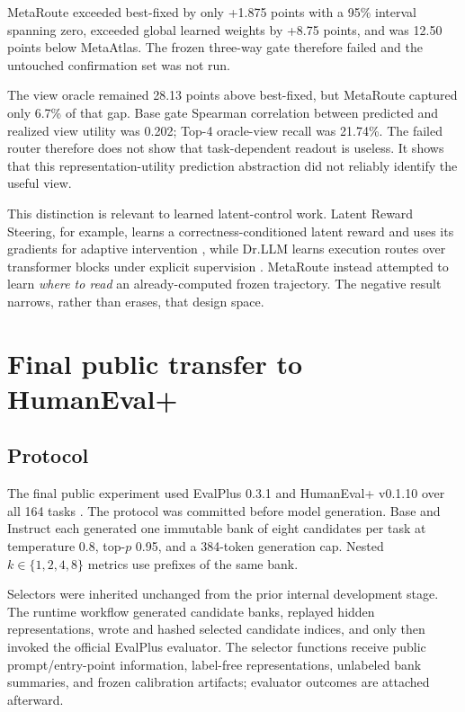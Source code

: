 \documentclass[11pt]{article}
\begin{document}
MetaRoute exceeded best-fixed by only +1.875 points with a 95\% interval spanning zero, exceeded global learned weights by +8.75 points, and was 12.50 points below MetaAtlas. The frozen three-way gate therefore failed and the untouched confirmation set was not run.

The view oracle remained 28.13 points above best-fixed, but MetaRoute captured only 6.7\% of that gap. Base gate Spearman correlation between predicted and realized view utility was 0.202; Top-4 oracle-view recall was 21.74\%. The failed router therefore does not show that task-dependent readout is useless. It shows that this representation-utility prediction abstraction did not reliably identify the useful view.

This distinction is relevant to learned latent-control work. Latent Reward Steering, for example, learns a correctness-conditioned latent reward and uses its gradients for adaptive intervention \cite{li2026latent}, while Dr.LLM learns execution routes over transformer blocks under explicit supervision \cite{heakl2026drllm}. MetaRoute instead attempted to learn \emph{where to read} an already-computed frozen trajectory. The negative result narrows, rather than erases, that design space.

\section{Final public transfer to HumanEval+}

\subsection{Protocol}

The final public experiment used EvalPlus 0.3.1 and HumanEval+ v0.1.10 over all 164 tasks \cite{liu2023evalplus}. The protocol was committed before model generation. Base and Instruct each generated one immutable bank of eight candidates per task at temperature 0.8, top-$p$ 0.95, and a 384-token generation cap. Nested $k\in\{1,2,4,8\}$ metrics use prefixes of the same bank.

Selectors were inherited unchanged from the prior internal development stage. The runtime workflow generated candidate banks, replayed hidden representations, wrote and hashed selected candidate indices, and only then invoked the official EvalPlus evaluator. The selector functions receive public prompt/entry-point information, label-free representations, unlabeled bank summaries, and frozen calibration artifacts; evaluator outcomes are attached afterward.
\end{document}
